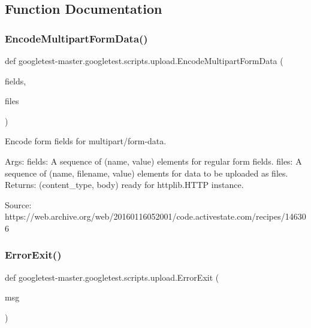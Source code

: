\subsection{Function Documentation}
\mbox{\label{namespacegoogletest-master_1_1googletest_1_1scripts_1_1upload_aeb3f87241f2743e716fa7c722f6753bf}} 
\subsubsection{\texorpdfstring{EncodeMultipartFormData()}{EncodeMultipartFormData()}}
{\footnotesize\ttfamily def googletest-\/master.\+googletest.\+scripts.\+upload.\+Encode\+Multipart\+Form\+Data (\begin{DoxyParamCaption}\item[{}]{fields,  }\item[{}]{files }\end{DoxyParamCaption})}

\begin{DoxyVerb}Encode form fields for multipart/form-data.

Args:
  fields: A sequence of (name, value) elements for regular form fields.
  files: A sequence of (name, filename, value) elements for data to be
         uploaded as files.
Returns:
  (content_type, body) ready for httplib.HTTP instance.

Source:
  https://web.archive.org/web/20160116052001/code.activestate.com/recipes/146306
\end{DoxyVerb}
 \mbox{\label{namespacegoogletest-master_1_1googletest_1_1scripts_1_1upload_a7da92ea4ed68a1cae6a56be7bd1cd580}} 
\subsubsection{\texorpdfstring{ErrorExit()}{ErrorExit()}}
{\footnotesize\ttfamily def googletest-\/master.\+googletest.\+scripts.\+upload.\+Error\+Exit (\begin{DoxyParamCaption}\item[{}]{msg }\end{DoxyParamCaption})}

